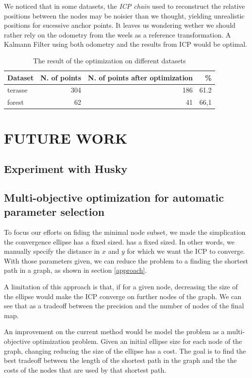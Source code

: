 \documentclass[letterpaper,10 pt,conference]{ieeeconf}
\begin{document}
We noticed that in some datasets, the \textit{ICP chain} used to reconstruct the relative positions
between the nodes may be noisier than we thought, yielding unrealistic positions for sucessive
anchor points. It leaves us wondering wether we should rather rely on the odometry from the weels as
a reference transformation. A Kalmann Filter using both odometry and the results from ICP would be
optimal.

\begin{table}[h]
\centering
\begin{tabular}{|l|r|r|r|}
  \hline
Dataset & N. of points & N. of points after optimization & \% \\
\hline
terasse & 304 & 186 & 61.2 \\
  \hline
forest & 62 & 41 & 66,1 \\
  \hline
\end{tabular}
\caption{The result of the optimization on different datasets}
\label{tabopti}
\end{table}

\section{FUTURE WORK}

\subsection{Experiment with Husky}

\subsection{Multi-objective optimization for automatic parameter selection}

To focus our efforts on fiding the minimal node subset, we made the simplication the convergence ellipse has a fixed sized.
has a fixed sized.  In other words, we manually specify the distance in $x$ and $y$ for which we
want the ICP to converge. With those parameters given, we can reduce the problem to a finding the
shortest path in a graph, as shown in section \ref{approach}.


A limitation of this approach is that, if for a given node, decreasing the size of the ellipse would
make the ICP converge on further nodes of the graph. We can see that as a tradeoff between the
precision and the number of nodes of the final map.


An improvement on the current method would be model the problem as a multi-objective optimization
problem. Given an initial ellipse size for each node of the graph, changing reducing the size of the
ellipse has a cost. The goal is to find the best tradeoff between the length of the shortest path in
the graph and the the costs of the nodes that are used by that shortest path.
\end{document}
